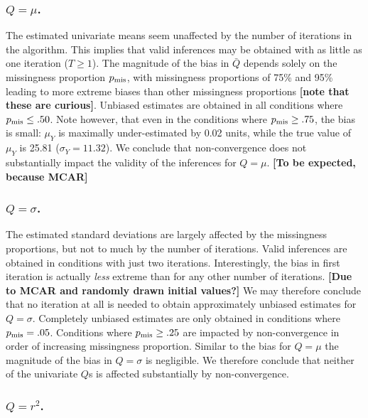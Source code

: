 \documentclass[Royal,times,sageh]{sagej}
\begin{document}
\hypertarget{qmu.}{%
\subsubsection{\texorpdfstring{\(Q=\mu\).}{Q=\textbackslash mu.}}\label{qmu.}}

The estimated univariate means seem unaffected by the number of iterations in the algorithm. This implies that valid inferences may be obtained with as little as one iteration (\(T \geq 1\)). The magnitude of the bias in \(\bar{Q}\) depends solely on the missingness proportion \(p_{\rm mis}\), with missingness proportions of 75\% and 95\% leading to more extreme biases than other missingness proportions \textbf{{[}note that these are curious{]}}. Unbiased estimates are obtained in all conditions where \(p_{\rm mis}\leq.50\). Note however, that even in the conditions where \(p_{\rm mis}\geq.75\), the bias is small: \(\mu_Y\) is maximally under-estimated by 0.02 units, while the true value of \(\mu_Y\) is 25.81 (\(\sigma_Y = 11.32\)). We conclude that non-convergence does not substantially impact the validity of the inferences for \(Q=\mu\). \textbf{{[}To be expected, because MCAR{]}}

\hypertarget{qsigma.}{%
\subsubsection{\texorpdfstring{\(Q=\sigma\).}{Q=\textbackslash sigma.}}\label{qsigma.}}

The estimated standard deviations are largely affected by the missingness proportions, but not to much by the number of iterations. Valid inferences are obtained in conditions with just two iterations. Interestingly, the bias in first iteration is actually \emph{less} extreme than for any other number of iterations. \textbf{{[}Due to MCAR and randomly drawn initial values?{]}} We may therefore conclude that no iteration at all is needed to obtain approximately unbiased estimates for \(Q=\sigma\). Completely unbiased estimates are only obtained in conditions where \(p_{\rm mis}=.05\). Conditions where \(p_{\rm mis}\geq.25\) are impacted by non-convergence in order of increasing missingness proportion. Similar to the bias for \(Q=\mu\) the magnitude of the bias in \(Q=\sigma\) is negligible. We therefore conclude that neither of the univariate \(Q\)s is affected substantially by non-convergence.

\hypertarget{qr2.}{%
\subsubsection{\texorpdfstring{\(Q=r^2\).}{Q=r\^{}2.}}\label{qr2.}}
\end{document}
